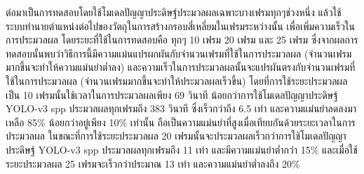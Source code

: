 ต่อมาเป็นการทดสอบโดยใช้โมเดลปัญญาประดิษฐ์ประมวลผลเฉพาะบางเฟรมทุกๆช่วงหนึ่ง แล้วใช้ระบบทำนายตำแหน่งต่อไปของวัตถุในการสร้างกรอบสี่เหลี่ยมในเฟรมระหว่างนั้น เพื่อเพิ่มความเร็วในการประมวลผล 
โดยระยะที่ใช้ในการทดสอบคือ ทุกๆ 10 เฟรม 20 เฟรม และ 25 เฟรม ซึ่งจากผลการทดสอบนั้นพบว่าวิธีการนี้มีความแม่นแปรผกผันกับจำนวนเฟรมที่ใช้ในการประมวลผล (จำนวนเฟรมมากขึ้นจะทำให้ความแม่นยำต่ำลง) 
และความเร็วในการประมวลผลนั้นจะแปรผันตรงกับจำนวนเฟรมที่ใช้ในการประมวลผล (จำนวนเฟรมมากขึ้นจะทำให้ประมวลผลเร็วขึ้น) โดยที่การใช้ระยะประมวลผลเป็น 10 เฟรมนั้นใช้เวลาในการประมวลผลเพียง 69 วินาที 
น้อยกว่าการใช้โมเดลปัญญาประดิษฐ์ YOLO-v3 spp ประมวลผลทุกเฟรมถึง 383 วินาที ซึ่งเร็วกว่าถึง 6.5 เท่า และความแม่นยำลดลงมาเหลือ 85\% น้อยกว่าอยู่เพียง 10\% เท่านั้น ถือเป็นความแม่นยำที่สูงเมื่อเทียบกันด้วยระยะเวลาในการประมวลผล
ในขณะที่การใช้ระยะประมวลผล 20 เฟรมนั้นจะประมวลผลเร็วกว่าการใช้โมเดลปัญญาประดิษฐ์ YOLO-v3 spp ประมวลผลทุกเฟรมถึง 11 เท่า และมีความแม่นยำต่ำกว่า 15\%
และเมื่อใช้ระยะประมวลผล 25 เฟรมจะเร็วกว่าประมาณ 13 เท่า และความแม่นยำต่ำลงถึง 20\% 